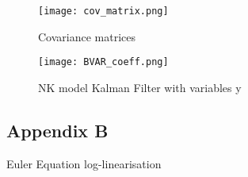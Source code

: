 \documentclass[12pt,a4paper,english]{article} %
\begin{document}
	\begin{figure}[H]
		\begin{center}
			\texttt{[image: cov\_matrix.png]}
			\caption{Covariance matrices}
			\label{fig:cov_matrix}
		\end{center}
	\end{figure}
	

	\begin{figure}[H]
		\begin{center}
			\texttt{[image: BVAR\_coeff.png]}
			\caption{NK model Kalman Filter with variables y}\label{fig:bvar_coef}
		\end{center}
	\end{figure}

	\pagebreak
	
	\pagebreak
	\subsection*{Appendix B} \label{appb}
	Euler Equation log-linearisation\\
	
\end{document}
